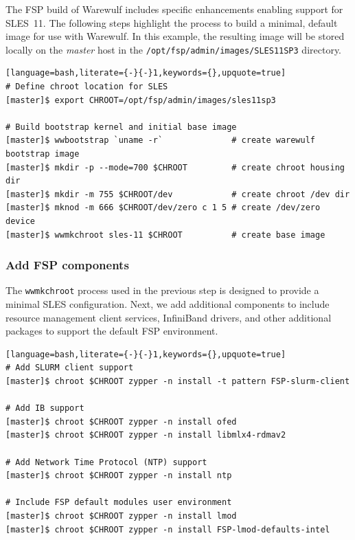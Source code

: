 \documentclass[letterpaper]{article}
\newcommand{\baseOS}{SLES11SP3}
\begin{document}
The FSP build of Warewulf includes specific enhancements enabling support for
SLES~11. The following steps highlight the process to build a minimal, default
image for use with Warewulf. In this example, the resulting image will be
stored locally on the {\em master} host in the
\texttt{/opt/fsp/admin/images/\baseOS{}} directory.

\begin{lstlisting}[language=bash,literate={-}{-}1,keywords={},upquote=true]
# Define chroot location for SLES 
[master]$ export CHROOT=/opt/fsp/admin/images/sles11sp3

# Build bootstrap kernel and initial base image
[master]$ wwbootstrap `uname -r`              # create warewulf bootstrap image
[master]$ mkdir -p --mode=700 $CHROOT         # create chroot housing dir
[master]$ mkdir -m 755 $CHROOT/dev            # create chroot /dev dir
[master]$ mknod -m 666 $CHROOT/dev/zero c 1 5 # create /dev/zero device
[master]$ wwmkchroot sles-11 $CHROOT          # create base image

\end{lstlisting}

\subsubsection{Add FSP components}

The \texttt{wwmkchroot} process used in the previous step is designed to
provide a minimal SLES configuration. Next, we add additional components to
include resource management client services, InfiniBand drivers, and other
additional packages to support the default FSP environment.

\begin{lstlisting}[language=bash,literate={-}{-}1,keywords={},upquote=true]
# Add SLURM client support
[master]$ chroot $CHROOT zypper -n install -t pattern FSP-slurm-client

# Add IB support
[master]$ chroot $CHROOT zypper -n install ofed
[master]$ chroot $CHROOT zypper -n install libmlx4-rdmav2

# Add Network Time Protocol (NTP) support
[master]$ chroot $CHROOT zypper -n install ntp

# Include FSP default modules user environment
[master]$ chroot $CHROOT zypper -n install lmod 
[master]$ chroot $CHROOT zypper -n install FSP-lmod-defaults-intel
\end{lstlisting}
\end{document}
